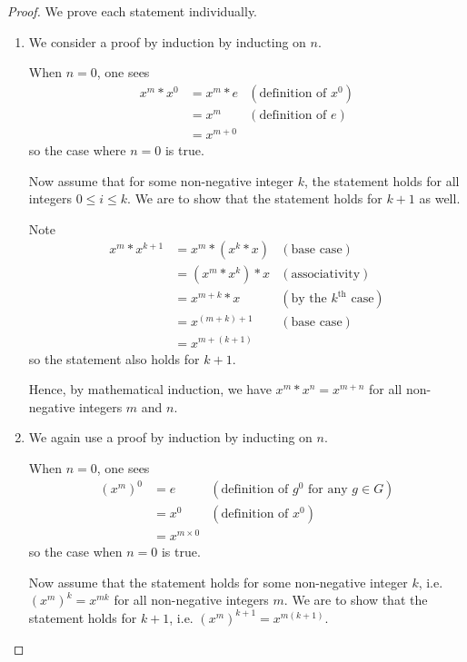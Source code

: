 \newpage

\begin{proof}
    We prove each statement individually.
    \begin{enumerate}
        \item We consider a proof by induction by inducting on $n$.

        When $n = 0$, one sees
        \begin{align*}
            x^m \ast x^0 &= x^m \ast e & (\text{definition of }x^0)\\
            &= x^m & (\text{definition of }e)\\
            &= x^{m+0}
        \end{align*}
        so the case where $n=0$ is true.

        Now assume that for some non-negative integer $k$, the statement holds for all integers $0 \leq i \leq k$. We are to show that the statement holds for $k+1$ as well.

        Note
        \begin{align*}
            x^m\ast x^{k+1} &= x^m\ast (x^k\ast x) & (\text{base case})\\
            &= (x^m \ast x^k) \ast x & (\text{associativity})\\
            &= x^{m+k}\ast x & (\text{by the }k^{\text{th}}\text{ case})\\
            &= x^{(m+k)+1} & (\text{base case})\\
            &= x^{m+(k+1)}
        \end{align*}
        so the statement also holds for $k+1$.

        Hence, by mathematical induction, we have $x^m \ast x^n = x^{m+n}$ for all non-negative integers $m$ and $n$.

        \item We again use a proof by induction by inducting on $n$.

        When $n = 0$, one sees
        \begin{align*}
            \left(x^m\right)^0 &= e & (\text{definition of }g^0 \text{ for any }g\in G)\\
            &= x^0 & (\text{definition of }x^0)\\
            &= x^{m \times 0}
        \end{align*}
        so the case when $n = 0$ is true.

        Now assume that the statement holds for some non-negative integer $k$, i.e. $\left(x^m\right)^k = x^{mk}$ for all non-negative integers $m$. We are to show that the statement holds for $k+1$, i.e. $\left(x^m\right)^{k+1} = x^{m(k+1)}$.


\end{enumerate}
\end{proof}
